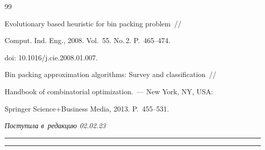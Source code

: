 {{\begin{thebibliography}{99}

 Evolutionary based heuristic for bin packing problem~/\!\!/ 

Comput. Ind. Eng., 2008. Vol.~55. No.\,2. P.~465--474. 

doi: 10.1016\!/\!j.cie.2008.01.007.



Bin packing approximation algorithms: Survey and classification~/\!\!/ 

Handbook of combinatorial optimization.~--- New York, NY, USA: 

Springer Science\;+\;Business Media, 2013. P.~455--531.



   \end{thebibliography}

} }







\vspace*{-6pt}



\hfill{\small\textit{Поступила в~редакцию 02.02.23}}



\vspace*{8pt}



\hrule



\vspace*{2pt}



\hrule
















\def\tit{EFFICIENCY OF THE~REDUCTION ALGORITHMS IN~THE~BIN~PACKING~PROBLEM}







\def\titkol{Efficiency of the~reduction algorithms in~the~bin packing problem}



